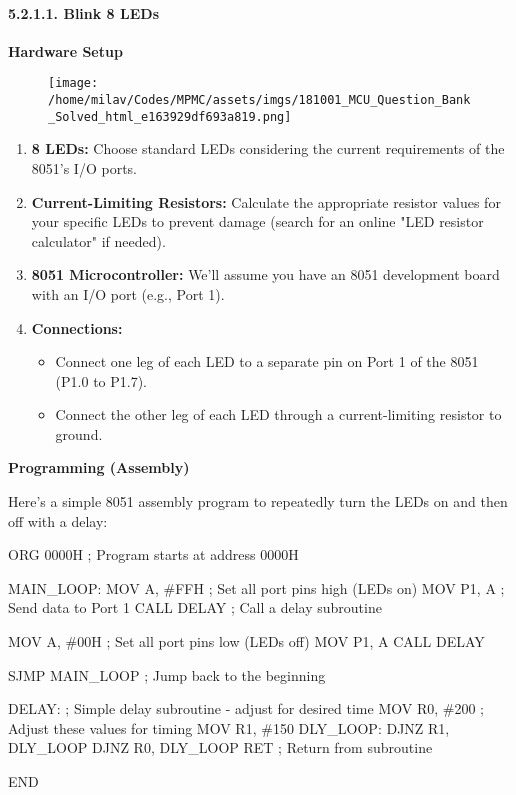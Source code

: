 \documentclass[
]{article}
\newenvironment{Shaded}{}{}
\newcommand{\NormalTok}[1]{#1}
\begin{document}
\hypertarget{5211-blink-8-leds}{%
\paragraph{5.2.1.1. Blink 8 LEDs}\label{5211-blink-8-leds}}

\textbf{Hardware Setup}

\begin{figure}
\centering
\texttt{[image: /home/milav/Codes/MPMC/assets/imgs/181001\_MCU\_Question\_Bank\_Solved\_html\_e163929df693a819.png]}
\caption{}
\end{figure}

\begin{enumerate}
\def\labelenumi{\arabic{enumi}.}
\item
  \textbf{8 LEDs:} Choose standard LEDs considering the current
  requirements of the 8051's I/O ports.
\item
  \textbf{Current-Limiting Resistors:} Calculate the appropriate
  resistor values for your specific LEDs to prevent damage (search for
  an online "LED resistor calculator" if needed).
\item
  \textbf{8051 Microcontroller:} We'll assume you have an 8051
  development board with an I/O port (e.g., Port 1).
\item
  \textbf{Connections:}

  \begin{itemize}
  \item
    Connect one leg of each LED to a separate pin on Port 1 of the 8051
    (P1.0 to P1.7).
  \item
    Connect the other leg of each LED through a current-limiting
    resistor to ground.
  \end{itemize}
\end{enumerate}

\textbf{Programming (Assembly)}

Here's a simple 8051 assembly program to repeatedly turn the LEDs on and
then off with a delay:

\begin{Shaded}
\begin{Highlighting}[]
\NormalTok{ORG 0000H  ; Program starts at address 0000H}

\NormalTok{MAIN\_LOOP:}
\NormalTok{    MOV A, \#FFH   ; Set all port pins high (LEDs on)}
\NormalTok{    MOV P1, A     ; Send data to Port 1}
\NormalTok{    CALL DELAY    ; Call a delay subroutine}

\NormalTok{    MOV A, \#00H   ; Set all port pins low (LEDs off)}
\NormalTok{    MOV P1, A}
\NormalTok{    CALL DELAY}

\NormalTok{    SJMP MAIN\_LOOP  ; Jump back to the beginning}

\NormalTok{DELAY:  ; Simple delay subroutine {-} adjust for desired time}
\NormalTok{    MOV R0, \#200   ; Adjust these values for timing}
\NormalTok{    MOV R1, \#150}
\NormalTok{DLY\_LOOP: DJNZ R1, DLY\_LOOP}
\NormalTok{          DJNZ R0, DLY\_LOOP}
\NormalTok{          RET  ; Return from subroutine}

\NormalTok{END}
\end{Highlighting}
\end{Shaded}
\end{document}

